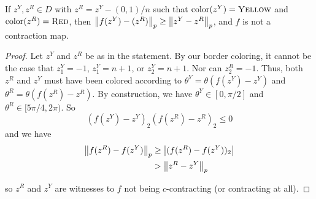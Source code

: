   \begin{lemma} \label{lemma:YellowAboveRed}
    If $z^Y, z^R \in D$ with $z^R = z^Y - (0,1)/n$ such that $\operatorname{color}(z^Y) = \textsc{Yellow}$ and $\operatorname{color}(z^R) = \textsc{Red}$, then $\left\| f(z^Y) - (z^R) \right\|_p \geq \left\| z^Y - z^R \right\|_p$, and $f$ is not a contraction map.
  \end{lemma}

  \begin{proof}
    Let $z^Y$ and $z^R$ be as in the statement. By our border coloring, it cannot be the case that $z^Y_1 = -1$, $z^Y_1 = n+1$, or $z^Y_2 = n+1$. Nor can $z^R_2 = -1$. Thus, both $z^R$ and $z^Y$ must have been colored according to $\theta^Y = \theta(f(z^Y) - z^Y)$ and $\theta^R = \theta(f(z^R) - z^R)$. By construction, we have $\theta^Y \in [0,\pi/2]$ and $\theta^R \in [5\pi/4,2\pi)$. So \[ (f(z^Y) - z^Y)_2 (f(z^R) - z^R)_2 \leq 0 \] and we have
    \begin{align*}
      \left\| f(z^R) - f(z^Y) \right\|_p &\geq \left| (f(z^R) - f(z^Y))_2 \right| \\
                               &> \left\| z^R - z^Y \right\|_p
    \end{align*}

    so $z^R$ and $z^Y$ are witnesses to $f$ not being $c$-contracting (or contracting at all).
  \end{proof}

